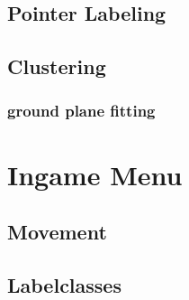 \subsection{Pointer Labeling}
\subsection{Clustering}
\subsubsection{ground plane fitting}

\section{Ingame Menu}
\subsection{Movement}
\subsection{Labelclasses}



